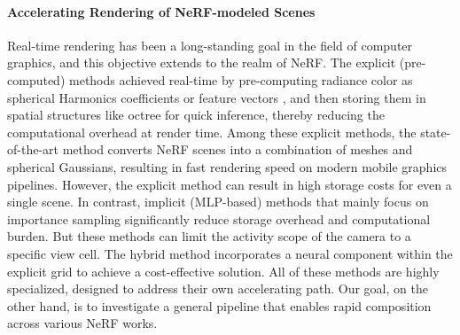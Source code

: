 \documentclass[letterpaper]{article} %
\begin{document}
\paragraph{Accelerating Rendering of NeRF-modeled Scenes}
Real-time rendering has been a long-standing goal in the field of computer graphics, and this objective extends to the realm of NeRF. The explicit (pre-computed) methods achieved real-time by pre-computing radiance color as spherical Harmonics coefficients \cite{yu2021plenoctrees} or feature vectors \cite{hedman2021baking,chen2022mobilenerf}, and then storing them in spatial structures like octree for quick inference, thereby reducing the computational overhead at render time. Among these explicit methods, the state-of-the-art method \cite{bakedsdf2023sig} converts NeRF scenes into a combination of meshes and spherical Gaussians, resulting in fast rendering speed on modern mobile graphics pipelines. However, the explicit method can result in high storage costs for even a single scene. In contrast, implicit (MLP-based) methods that mainly focus on importance sampling \cite{piala2021terminerf, neff2021donerf, kurz2022adanerf, Niemeyer2021Regnerf} significantly reduce storage overhead and computational burden. But these methods can limit the activity scope of the camera to a specific view cell. The hybrid method \cite{liu2020neural} incorporates a neural component within the explicit grid to achieve a cost-effective solution. All of these methods are highly specialized, designed to address their own accelerating path. Our goal, on the other hand, is to investigate a general pipeline that enables rapid composition across various NeRF works.
\end{document}
